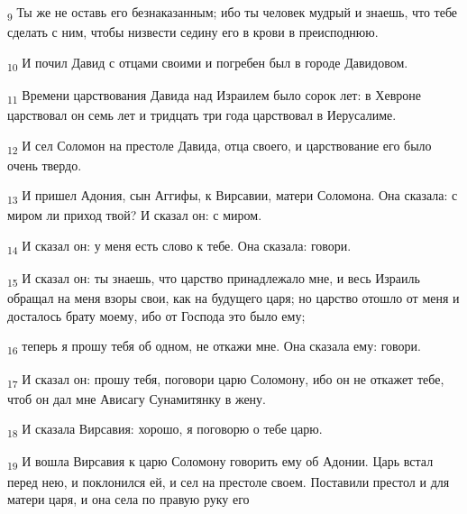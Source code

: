 \begin{tcolorbox}
\textsubscript{9} Ты же не оставь его безнаказанным; ибо ты человек мудрый и знаешь, что тебе сделать с ним, чтобы низвести седину его в крови в преисподнюю.
\end{tcolorbox}
\begin{tcolorbox}
\textsubscript{10} И почил Давид с отцами своими и погребен был в городе Давидовом.
\end{tcolorbox}
\begin{tcolorbox}
\textsubscript{11} Времени царствования Давида над Израилем было сорок лет: в Хевроне царствовал он семь лет и тридцать три года царствовал в Иерусалиме.
\end{tcolorbox}
\begin{tcolorbox}
\textsubscript{12} И сел Соломон на престоле Давида, отца своего, и царствование его было очень твердо.
\end{tcolorbox}
\begin{tcolorbox}
\textsubscript{13} И пришел Адония, сын Аггифы, к Вирсавии, матери Соломона. Она сказала: с миром ли приход твой? И сказал он: с миром.
\end{tcolorbox}
\begin{tcolorbox}
\textsubscript{14} И сказал он: у меня есть слово к тебе. Она сказала: говори.
\end{tcolorbox}
\begin{tcolorbox}
\textsubscript{15} И сказал он: ты знаешь, что царство принадлежало мне, и весь Израиль обращал на меня взоры свои, как на будущего царя; но царство отошло от меня и досталось брату моему, ибо от Господа это было ему;
\end{tcolorbox}
\begin{tcolorbox}
\textsubscript{16} теперь я прошу тебя об одном, не откажи мне. Она сказала ему: говори.
\end{tcolorbox}
\begin{tcolorbox}
\textsubscript{17} И сказал он: прошу тебя, поговори царю Соломону, ибо он не откажет тебе, чтоб он дал мне Ависагу Сунамитянку в жену.
\end{tcolorbox}
\begin{tcolorbox}
\textsubscript{18} И сказала Вирсавия: хорошо, я поговорю о тебе царю.
\end{tcolorbox}
\begin{tcolorbox}
\textsubscript{19} И вошла Вирсавия к царю Соломону говорить ему об Адонии. Царь встал перед нею, и поклонился ей, и сел на престоле своем. Поставили престол и для матери царя, и она села по правую руку его
\end{tcolorbox}
